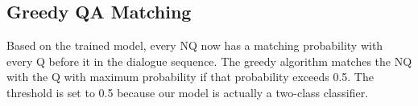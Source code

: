 \subsection{Greedy QA Matching}

Based on the trained model, every NQ now has a matching probability with every Q 
before it in the dialogue sequence. The greedy algorithm matches the NQ with the
Q with maximum probability if that probability exceeds 0.5.
The threshold is set to 0.5 because our model is actually a two-class classifier.












